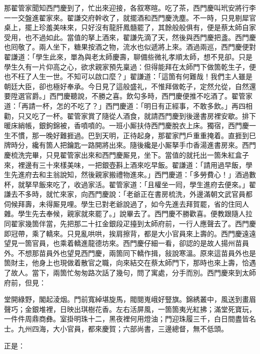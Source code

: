 那翟管家聞知西門慶到了，忙出來迎接，各叙寒暄。吃了茶，西門慶叫玳安將行李一一交盤進翟家來。翟謙交府幹收了，就擺酒和西門慶洗塵。不一時，只見剔犀官桌上，擺上珍羞美味來，只好沒有龍肝鳳髓罷了，其餘般般俱有，便是蔡太師自家受用，也不過如此。當值的拏上酒來，翟謙先滴了天，然後與西門慶把盞。西門慶也囘敬了。兩人坐下，糖果按酒之物，流水也似遞將上來。酒過兩巡，西門慶便對翟謙道：「學生此來，單為與老太師慶壽，聊備些微礼孝順太師，想不見卻。只是學生久有一片仰高之心，欲求親家預先稟過：但得能拜在太師門下做箇乾生子，便也不枉了人生一世。{}不知可以啟口麼？」翟謙道：「這箇有何難哉！我們主人雖是朝廷大臣，卻也極好奉承。今日見了這般盛礼，不惟拜做乾子，定然允從，自然還要陞選官爵。」{}西門慶聽說，不勝之喜。飲勾多時，西門慶便推不吃酒了。翟管家道：「再請一杯，怎的不吃了？」西門慶道：「明日有正經事，不敢多飲。」再四相勸，只又吃了一杯。翟管家賞了隨從人酒食，就請西門慶到後邊書房裡安歇。排下暖床綃帳，銀鉤錦被，香噴噴的。一班小厮扶侍西門慶脫衣上床。獨宿，西門慶一生不慣，那一晚好難捱過。巴到天明，正待起身，那翟家門戶重重掩着。直捱到巳牌時分，纔有箇人把鑰匙一路開將出來。隨後纔是小厮拏手巾香湯進書房來。西門慶梳洗完畢，只見翟管家出來和西門慶厮見，坐下。當值的就托出一箇朱紅盒子來，裡邊有三十來樣美味，一把銀壺斟上酒來吃早飯。翟謙道：「請用過早飯，學生先進府去和主翁說知，然後親家搬禮物進來。」西門慶道：「多勞費心！」酒過數杯，就拏早飯來吃了，收過家活。翟管家道：「且權坐一囘，學生進府去便來。」翟謙去不多時，就忙來家，{}向西門慶說：「老爺正在書房梳洗，外邊滿朝文武官員都伺候拜壽，未得厮見哩。學生已對老爺說過了，如今先進去拜賀罷，省的住囘人雜。學生先去奉候，親家就來罷了。」說畢去了。西門慶不勝歡喜。便教跟隨人拉同翟家幾箇伴當，先把那二十扛金銀段疋擡到太師府前，一行人應聲去了。西門慶即冠帶，乘了轎來。只見亂哄哄，挨肩擦背，都是大小官員來上壽的。西門慶遠遠望見一箇官員，也乘着轎進龍德坊來。西門慶仔細一看，卻認的是故人揚州苗員外。不想那苗員外也望見西門慶，兩箇同下轎作揖，敍說寒溫。原來這苗員外也是箇財主，他身上也現做着散官之職，向來結交在蔡太師門下，那時也來上壽，恰遇了故人。當下，兩箇忙匆匆路次話了幾句，問了寓處，分手而別。{}西門慶來到太師府前，但見：

堂開綠野，閣起淩烟。門前寬綽堪旋馬，閥閱嵬峨好豎旗。錦綉叢中，風送到畫眉聲巧；金銀堆裡，日映出琪樹花香。左右活屏風，一箇箇夷光紅拂；滿堂死寶玩，一件件周鼎商彝。室掛明珠十二，黑夜裡何用燈油；門迎珠履三千，白日間盡皆名士。九州四海，大小官員，都來慶賀；六部尚書，三邊總督，無不低頭。

正是：

